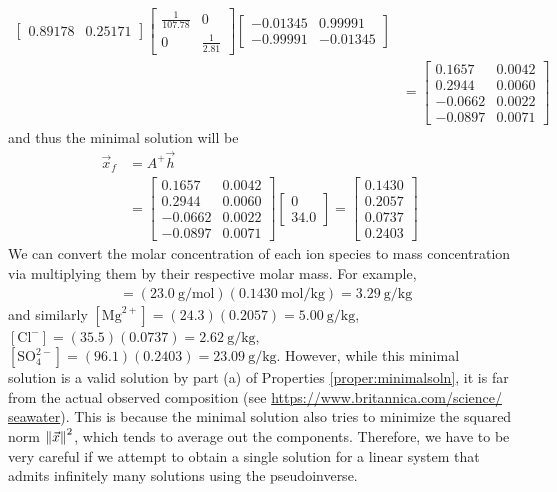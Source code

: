 \begin{solution}
\begin{align*}
\begin{bmatrix}
0.89178 & 0.25171
\end{bmatrix}
\begin{bmatrix}
\frac{1}{107.78} & 0 \\
0 & \frac{1}{2.81}
\end{bmatrix}
\begin{bmatrix}
-0.01345 & 0.99991 \\
-0.99991 & -0.01345
\end{bmatrix} \\
&=
\begin{bmatrix}
0.1657 & 0.0042 \\
0.2944 & 0.0060 \\
-0.0662 & 0.0022 \\
-0.0897 & 0.0071 
\end{bmatrix}
\end{align*}
and thus the minimal solution will be
\begin{align*}
\vec{x}_f &= A^+\vec{h} \\
&= 
\begin{bmatrix}
0.1657 & 0.0042 \\
0.2944 & 0.0060 \\
-0.0662 & 0.0022 \\
-0.0897 & 0.0071 
\end{bmatrix}
\begin{bmatrix}
0 \\
34.0
\end{bmatrix}
=
\begin{bmatrix}
0.1430 \\
0.2057 \\
0.0737 \\
0.2403
\end{bmatrix}
\end{align*}
We can convert the molar concentration of each ion species to mass concentration via multiplying them by their respective molar mass. For example,
\begin{align*}
[\text{Na}^+] &= (\SI{23.0}{\g \per \mol})(\SI{0.1430}{\mol \per \kg}) = \SI{3.29}{\g \per \kg}
\end{align*}
and similarly $[\text{Mg}^{2+}] = (24.3)(0.2057) = \SI{5.00}{\g \per \kg}$, $[\text{Cl}^{-}] = (35.5)(0.0737) \allowbreak = \SI{2.62}{\g \per \kg}$, $[\text{SO}_4^{2-}] = (96.1)(0.2403) = \SI{23.09}{\g \per \kg}$. However, while this minimal solution is a valid solution by part (a) of Properties \ref{proper:minimalsoln}, it is far from the actual observed composition (see \href{https://www.britannica.com/science/seawater}{https://www.britannica.com/science/\\seawater}). This is because the minimal solution also tries to minimize the squared norm $\norm{\vec{x}}^2$, which tends to average out the components. Therefore, we have to be very careful if we attempt to obtain a single solution for a linear system that admits infinitely many solutions using the pseudoinverse.
\end{solution}

